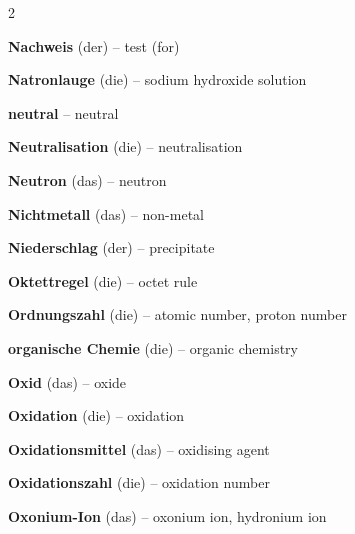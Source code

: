 \begin{multicols}{2}
\par\nopagebreak
\textbf{Nachweis} (der) -- test (for)\dotfill\hyperref[e:151]{\pageref*{e:151}}\par
\textbf{Natronlauge} (die) -- sodium hydroxide solution\dotfill\hyperref[e:181]{\pageref*{e:181}}\par
\textbf{neutral} -- neutral\dotfill\hyperref[e:156]{\pageref*{e:156}}\par
\textbf{Neutralisation} (die) -- neutralisation\dotfill\hyperref[e:166]{\pageref*{e:166}}\par
\textbf{Neutron} (das) -- neutron\dotfill\hyperref[e:75]{\pageref*{e:75}}\par
\textbf{Nichtmetall} (das) -- non-metal\dotfill\hyperref[e:19]{\pageref*{e:19}}\par
\textbf{Niederschlag} (der) -- precipitate\dotfill\hyperref[e:137]{\pageref*{e:137}}\par

\par\nopagebreak
\textbf{Oktettregel} (die) -- octet rule\dotfill\hyperref[e:97]{\pageref*{e:97}}\par
\textbf{Ordnungszahl} (die) -- atomic number, proton number\dotfill\hyperref[e:80]{\pageref*{e:80}}\par
\textbf{organische Chemie} (die) -- organic chemistry\dotfill\hyperref[e:208]{\pageref*{e:208}}\par
\textbf{Oxid} (das) -- oxide\dotfill\hyperref[e:188]{\pageref*{e:188}}\par
\textbf{Oxidation} (die) -- oxidation\dotfill\hyperref[e:183]{\pageref*{e:183}}\par
\textbf{Oxidationsmittel} (das) -- oxidising agent\dotfill\hyperref[e:186]{\pageref*{e:186}}\par
\textbf{Oxidationszahl} (die) -- oxidation number\dotfill\hyperref[e:122]{\pageref*{e:122}}\par
\textbf{Oxonium-Ion} (das) -- oxonium ion, hydronium ion\dotfill\hyperref[e:164]{\pageref*{e:164}}\par


\end{multicols}
